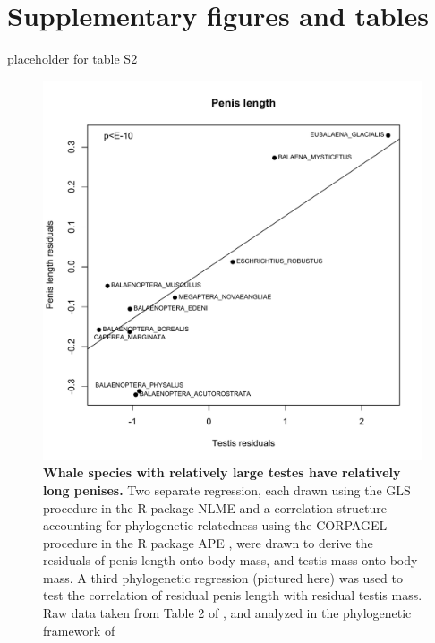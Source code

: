 \documentclass[12pt]{article}
\begin{document}
\clearpage

\section*{Supplementary figures and tables}

\begin{table}
  placeholder for table S2
\end{table}


\begin{figure}
\begin{center}
  \includegraphics[width=\textwidth]{S1}
\end{center}
\caption{
\textbf{Whale species with relatively large testes have
relatively long penises.} Two separate regression, each drawn using the GLS
procedure in the R package NLME and a correlation structure accounting for
phylogenetic relatedness \citep{pagel1999} using the CORPAGEL procedure in the R package APE \citep{paradis2004},
were drawn to derive the residuals of penis length onto body mass, and testis mass
onto body mass. A third phylogenetic regression (pictured here) was used to test the
correlation of residual penis length with residual testis mass. Raw data taken from
Table 2 of \citep{brownell1986}, and analyzed in the phylogenetic framework of \citep{mcgowen2009}
}
\end{figure}
\end{document}
